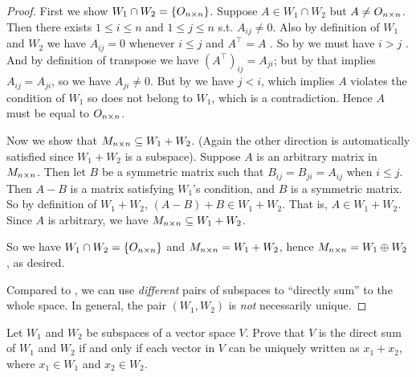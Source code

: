 \begin{proof}
First we show \(W_1 \cap W_2 = \{ O_{n \times n} \}\).
Suppose \(A \in W_1 \cap W_2\) but \(A \ne O_{n \times n}\).
Then there exists \(1 \le i \le n\) and \(1 \le j \le n\) s.t. \(A_{ij} \ne 0\).
Also by definition of \(W_1\) and \(W_2\) we have \(A_{ij} = 0\) whenever \(i \le j\)  and \(A^\top = A\) .
So by  we must have \(i > j\) .
And by definition of transpose we have \((A^\top)_{ij} = A_{ji}\);
but by  that implies \(A_{ij} = A_{ji}\), so we have \(A_{ji} \ne 0\).
But by  we have \(j < i\), which implies \(A\) violates the condition of \(W_1\) so does not belong to \(W_1\), which is a contradiction.
Hence \(A\) must be equal to \(O_{n \times n}\).

Now we show that \(M_{n \times n} \subseteq W_1 + W_2\).
(Again the other direction is automatically satisfied since \(W_1 + W_2\) is a subspace).
Suppose \(A\) is an arbitrary matrix in \(M_{n \times n}\).
Then let \(B\) be a symmetric matrix such that \(B_{ij} = B_{ji} = A_{ij}\) when \(i \le j\).
Then \(A - B\) is a matrix satisfying \(W_1\)'s condition, and \(B\) is a symmetric matrix.
So by definition of \(W_1 + W_2\), \((A - B) + B \in W_1 + W_2\).
That is, \(A \in W_1 + W_2\).
Since \(A\) is arbitrary, we have \(M_{n \times n} \subseteq W_1 + W_2\).

So we have \(W_1 \cap W_2 = \{ O_{n \times n} \}\) and \(M_{n \times n} = W_1 + W_2\), hence \(M_{n \times n} = W_1 \oplus W_2\), as desired.

Compared to , we can use \emph{different} pairs of subspaces to ``directly sum'' to the whole space.
In general, the pair \((W_1, W_2)\) is \emph{not} necessarily unique.
\end{proof}

\begin{exercise} \label{exercise 1.3.30}
Let \(W_1\) and \(W_2\) be subspaces of a vector space \(V\).
Prove that \(V\) is the direct sum of \(W_1\) and \(W_2\) if and only if each vector in \(V\) can be uniquely written as \(x_1 + x_2\), where \(x_1 \in W_1\) and \(x_2 \in W_2\).
\end{exercise}

